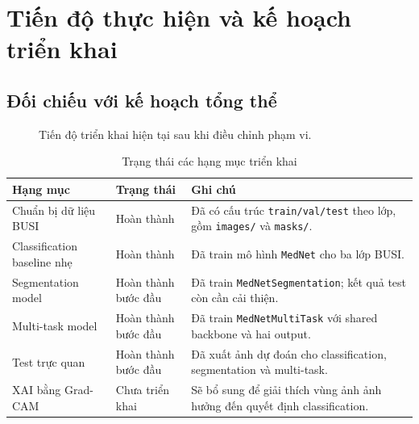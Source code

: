 \documentclass[12pt,a4paper]{article}
\begin{document}
\section{Tiến độ thực hiện và kế hoạch triển khai}

\subsection{Đối chiếu với kế hoạch tổng thể}

\begin{figure}[H]
\centering
{}
\caption{Tiến độ triển khai hiện tại sau khi điều chỉnh phạm vi.}
\end{figure}

\begin{table}[H]
\centering
\caption{Trạng thái các hạng mục triển khai}
\renewcommand{\arraystretch}{1.25}
\begin{tabular}{p{4.4cm} p{3.2cm} p{7.2cm}}
\toprule
\textbf{Hạng mục} & \textbf{Trạng thái} & \textbf{Ghi chú} \\
\midrule
Chuẩn bị dữ liệu BUSI & Hoàn thành & Đã có cấu trúc \texttt{train/val/test} theo lớp, gồm \texttt{images/} và \texttt{masks/}. \\
Classification baseline nhẹ & Hoàn thành & Đã train mô hình \texttt{MedNet} cho ba lớp BUSI. \\
Segmentation model & Hoàn thành bước đầu & Đã train \texttt{MedNetSegmentation}; kết quả test còn cần cải thiện. \\
Multi-task model & Hoàn thành bước đầu & Đã train \texttt{MedNetMultiTask} với shared backbone và hai output. \\
Test trực quan & Hoàn thành bước đầu & Đã xuất ảnh dự đoán cho classification, segmentation và multi-task. \\
XAI bằng Grad-CAM & Chưa triển khai & Sẽ bổ sung để giải thích vùng ảnh ảnh hưởng đến quyết định classification. \\
\bottomrule
\end{tabular}
\end{table}
\end{document}
